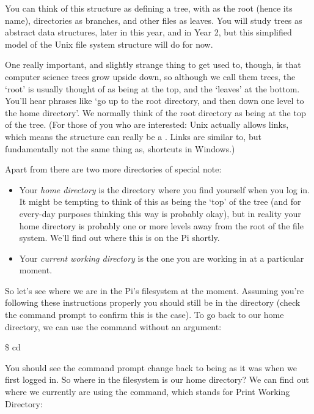 You can think of this structure as defining a tree, with \fname{/} as the root (hence its name), directories as branches, and other files as leaves. You will study trees as abstract data structures, later in this year, and in Year 2, but this simplified model of the Unix file system structure will do for now.

One really important, and slightly strange thing to get used to, though, is that computer science trees grow upside down, so although we call them trees, the `root' is usually thought of as being at the top, and the `leaves' at the bottom. You'll hear phrases like `go up to the root directory, and then down one level to the home directory'. We normally think of the root directory as being at the top of the tree. (For those of you who are interested: Unix actually allows links, which means the structure can really be a . Links are similar to, but fundamentally not the same thing as, shortcuts in Windows.)

Apart from \fname{/} there are two more directories of special note:
\begin{itemize}
\item Your \textit{home directory} is the directory where you find yourself when you log in. It might be tempting to think of this as being the `top' of the tree (and for every-day purposes thinking this way is probably okay), but in reality your home directory is probably one or more levels away from the root of the file system. We'll find out where this is on the Pi shortly.
\item Your \textit{current working directory} is the one you are working in at a particular moment.
\end{itemize}

So let's see where we are in the Pi's filesystem at the moment. Assuming you're following these instructions properly you should still be in the  directory (check the command prompt to confirm this is the case). To go back to our home directory, we can use the  command without an argument:
\begin{ttoutenv}
\$ cd
\end{ttoutenv}

You should see the command prompt change back to being as it was when we first logged in. So where in the filesystem is our home directory? We can find out where we currently are using the  command, which stands for Print Working Directory:

